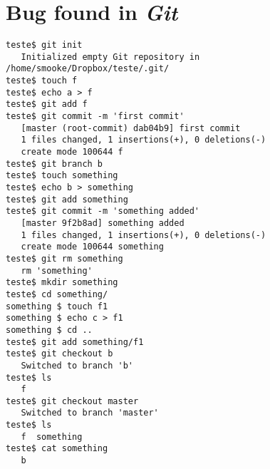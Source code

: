 \chapter{Bug found in \emph{Git}}
\label{bugappend}
\begin{lstlisting}
teste$ git init
   Initialized empty Git repository in /home/smooke/Dropbox/teste/.git/
teste$ touch f
teste$ echo a > f
teste$ git add f
teste$ git commit -m 'first commit'
   [master (root-commit) dab04b9] first commit
   1 files changed, 1 insertions(+), 0 deletions(-)
   create mode 100644 f
teste$ git branch b
teste$ touch something
teste$ echo b > something
teste$ git add something
teste$ git commit -m 'something added'
   [master 9f2b8ad] something added
   1 files changed, 1 insertions(+), 0 deletions(-)
   create mode 100644 something
teste$ git rm something
   rm 'something'
teste$ mkdir something
teste$ cd something/
something $ touch f1
something $ echo c > f1
something $ cd ..
teste$ git add something/f1
teste$ git checkout b
   Switched to branch 'b'
teste$ ls
   f
teste$ git checkout master
   Switched to branch 'master'
teste$ ls
   f  something
teste$ cat something
   b
\end{lstlisting}

